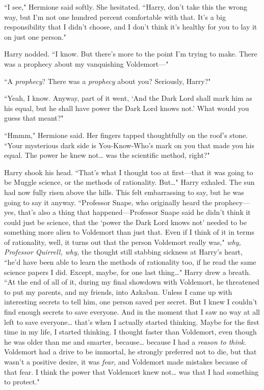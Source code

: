 ``I see," Hermione said softly. She hesitated. ``Harry, don't take this the wrong way, but I'm not one hundred percent comfortable with that. It's a big responsibility that I didn't choose, and I don't think it's healthy for you to lay it on just one person."

Harry nodded. ``I know. But there's more to the point I'm trying to make. There was a prophecy about my vanquishing Voldemort—"

``A \emph{prophecy}? There was a \emph{prophecy} about you? Seriously, Harry?"

``Yeah, I know. Anyway, part of it went, `And the Dark Lord shall mark him as his equal, but he shall have power the Dark Lord knows not.' What would you guess that meant?"

``Hmmm," Hermione said. Her fingers tapped thoughtfully on the roof's stone. ``Your mysterious dark side is You-Know-Who's mark on you that made you his equal. The power he knew not{\ldots} was the scientific method, right?"

Harry shook his head. ``That's what I thought too at first—that it was going to be Muggle science, or the methods of rationality. But{\ldots}" Harry exhaled. The sun had now fully risen above the hills. This felt embarrassing to say, but he was going to say it anyway. ``Professor Snape, who originally heard the prophecy—yes, that's also a thing that happened—Professor Snape said he didn't think it could just be science, that the `power the Dark Lord knows not' needed to be something more alien to Voldemort than just that. Even if I think of it in terms of rationality, well, it turns out that the person Voldemort really was," \emph{why, Professor Quirrell, why,} the thought still stabbing sickness at Harry's heart, ``he'd have been able to learn the methods of rationality too, if he read the same science papers I did. Except, maybe, for one last thing{\ldots}" Harry drew a breath. ``At the end of all of it, during my final showdown with Voldemort, he threatened to put my parents, and my friends, into Azkaban. Unless I came up with interesting secrets to tell him, one person saved per secret. But I knew I couldn't find enough secrets to save everyone. And in the moment that I saw no way at all left to save everyone{\ldots} that's when I actually started thinking. Maybe for the first time in my life, I started thinking. I thought faster than Voldemort, even though he was older than me and smarter, because{\ldots} because I had a \emph{reason to think}. Voldemort had a drive to be immortal, he strongly preferred not to die, but that wasn't a positive desire, it was \emph{fear}, and Voldemort made mistakes because of that fear. I think the power that Voldemort knew not{\ldots} was that I had something to protect."

